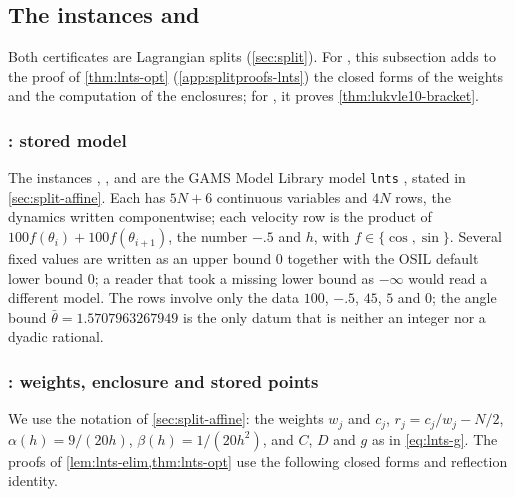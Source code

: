 \subsection{The  instances and }\label{app:lnts}

Both certificates are Lagrangian splits (\cref{sec:split}).
For , this subsection adds to the proof of \cref{thm:lnts-opt} (\cref{app:splitproofs-lnts}) the closed forms of the weights and the computation of the enclosures; for , it proves \cref{thm:lukvle10-bracket}.

\subsubsection{: stored model}\label{app:lnts-model}

The instances , ,  and  are the GAMS Model Library model \texttt{lnts} \citep{dolan2001-benchmarking-optimization-software-with-cops,library2026-cops-and-gams-source-models}, stated in \cref{sec:split-affine}.
Each has $5N+6$ continuous variables and $4N$ rows, the dynamics written componentwise; each velocity row is the product of $100f(\theta_i)+100f(\theta_{i+1})$, the number $-.5$ and $h$, with $f\in\{\cos,\sin\}$.
Several fixed values are written as an upper bound $0$ together with the OSIL default lower bound $0$; a reader that took a missing lower bound as $-\infty$ would read a different model.
The rows involve only the data $100$, $-.5$, $45$, $5$ and $0$; the angle bound $\bar\theta=1.5707963267949$ is the only datum that is neither an integer nor a dyadic rational.

\subsubsection{: weights, enclosure and stored points}\label{app:lnts-proof}

We use the notation of \cref{sec:split-affine}: the weights $w_j$ and $c_j$, $r_j=c_j/w_j-N/2$, $\alpha(h)=9/(20h)$, $\beta(h)=1/(20h^2)$, and $C$, $D$ and $g$ as in \eqref{eq:lnts-g}.
The proofs of \cref{lem:lnts-elim,thm:lnts-opt} use the following closed forms and reflection identity.

